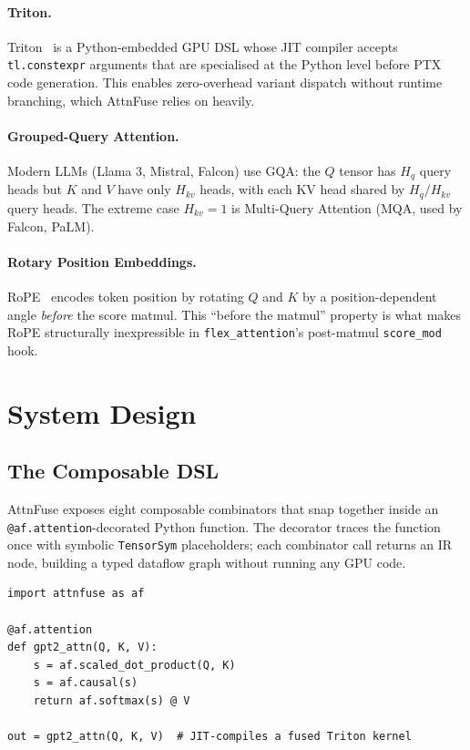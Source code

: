 \documentclass[10pt,twocolumn]{article}
\begin{document}
\paragraph{Triton.}
Triton~\cite{tillet2019triton} is a Python-embedded GPU DSL whose JIT
compiler accepts \texttt{tl.constexpr} arguments that are specialised
at the Python level before PTX code generation. This enables
zero-overhead variant dispatch without runtime branching, which AttnFuse
relies on heavily.

\paragraph{Grouped-Query Attention.}
Modern LLMs (Llama 3, Mistral, Falcon) use GQA: the $Q$ tensor has
$H_q$ query heads but $K$ and $V$ have only $H_{kv}$ heads, with each
KV head shared by $H_q / H_{kv}$ query heads. The extreme case
$H_{kv} = 1$ is Multi-Query Attention (MQA, used by Falcon, PaLM).

\paragraph{Rotary Position Embeddings.}
RoPE~\cite{su2021roformer} encodes token position by rotating $Q$ and
$K$ by a position-dependent angle \emph{before} the score matmul. This
``before the matmul'' property is what makes RoPE structurally
inexpressible in \texttt{flex\_attention}'s post-matmul \texttt{score\_mod} hook.

\section{System Design}

\subsection{The Composable DSL}
\label{sec:dsl}

AttnFuse exposes eight composable combinators that snap together inside
an \texttt{@af.attention}-decorated Python function. The decorator
traces the function once with symbolic \texttt{TensorSym} placeholders;
each combinator call returns an IR node, building a typed dataflow
graph without running any GPU code.

\begin{lstlisting}[caption={GPT-2-style causal attention in five lines of AttnFuse DSL.}]
import attnfuse as af

@af.attention
def gpt2_attn(Q, K, V):
    s = af.scaled_dot_product(Q, K)
    s = af.causal(s)
    return af.softmax(s) @ V

out = gpt2_attn(Q, K, V)  # JIT-compiles a fused Triton kernel
\end{lstlisting}
\end{document}
